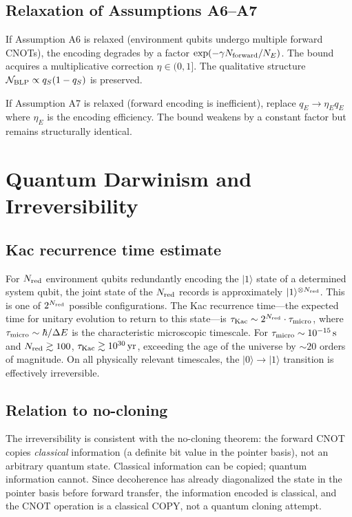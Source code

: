 \documentclass[aps,prl,twocolumn]{revtex4-2}
\begin{document}
\subsection{Relaxation of Assumptions A6--A7}

If Assumption A6 is relaxed (environment qubits undergo multiple forward CNOTs), the encoding degrades by a factor $\exp(-\gamma N_{\rm forward}/N_E)$. The bound acquires a multiplicative correction $\eta \in (0,1]$. The qualitative structure $\mathcal{N}_{\rm BLP} \propto q_S(1-q_S)$ is preserved.

If Assumption A7 is relaxed (forward encoding is inefficient), replace $q_E \to \eta_E q_E$ where $\eta_E$ is the encoding efficiency. The bound weakens by a constant factor but remains structurally identical.

\section{Quantum Darwinism and Irreversibility}

\subsection{Kac recurrence time estimate}

For $N_{\rm red}$ environment qubits redundantly encoding the $|1\rangle$ state of a determined system qubit, the joint state of the $N_{\rm red}$ records is approximately $|1\rangle^{\otimes N_{\rm red}}$. This is one of $2^{N_{\rm red}}$ possible configurations. The Kac recurrence time---the expected time for unitary evolution to return to this state---is $\tau_{\rm Kac} \sim 2^{N_{\rm red}} \cdot \tau_{\rm micro}$, where $\tau_{\rm micro} \sim \hbar/\Delta E$ is the characteristic microscopic timescale. For $\tau_{\rm micro} \sim 10^{-15}\,{\rm s}$ and $N_{\rm red} \gtrsim 100$, $\tau_{\rm Kac} \gtrsim 10^{30}\,{\rm yr}$, exceeding the age of the universe by $\sim 20$ orders of magnitude. On all physically relevant timescales, the $|0\rangle \to |1\rangle$ transition is effectively irreversible.

\subsection{Relation to no-cloning}

The irreversibility is consistent with the no-cloning theorem: the forward CNOT copies \emph{classical} information (a definite bit value in the pointer basis), not an arbitrary quantum state. Classical information can be copied; quantum information cannot. Since decoherence has already diagonalized the state in the pointer basis before forward transfer, the information encoded is classical, and the CNOT operation is a classical COPY, not a quantum cloning attempt.
\end{document}
